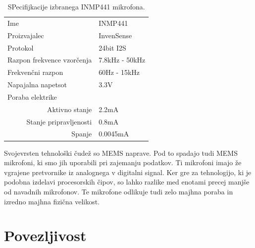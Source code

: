 \documentclass[a4paper, 12pt]{book}
\begin{document}
\begin{table}[]
\begin{tabular}{l|l}
Ime                                        & INMP441        \\
Proizvajalec                               & InvenSense     \\
Protokol                                   & 24bit I2S      \\
Razpon frekvence vzorčenja                 & 7.8kHz - 50kHz \\
Frekvenčni razpon                          & 60Hz - 15kHz   \\
Napajalna napetsot                         & 3.3V           \\
Poraba elektrike                           &                \\
\multicolumn{1}{r}{Aktivno stanje}         \vline & 2.2mA          \\
\multicolumn{1}{r}{Stanje pripravljenosti} \vline & 0.8mA          \\
\multicolumn{1}{r}{Spanje}                 \vline & 0.0045mA      
\end{tabular}
\caption{SPecifijkacije izbranega INMP441 mikrofona.}
\label{tbl:IMP441_spec}
\end{table}

Svojevrsten tehnološki čudež so MEMS naprave. Pod to spadajo tudi MEMS mikrofoni, ki smo jih uporabili pri zajemanju podatkov. Ti mikrofoni imajo že vgrajene pretvornike iz analognega v digitalni signal. Ker gre za tehnologijo, ki je podobna izdelavi procesorskih čipov, so lahko razlike med enotami precej manjše od navadnih mikrofonov. Te mikrofone odlikuje tudi zelo majhna poraba in izredno majhna fizična velikost.

\section{Povezljivost}
\end{document}
